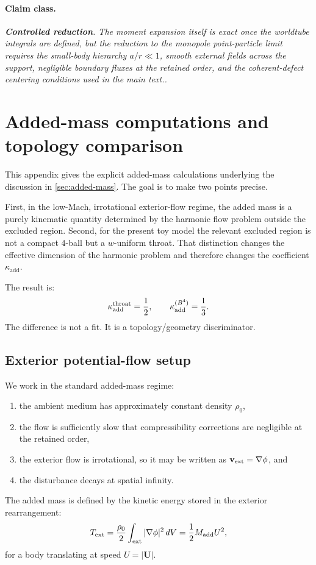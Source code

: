 \documentclass[11pt]{article}
\newcommand{\kadd}{\kappa_{\mathrm{add}}}
\newcommand{\Controlled}{\textbf{Controlled reduction}}
\newcommand{\claimclass}[1]{\paragraph{Claim class.}\emph{#1.}}
\begin{document}
\claimclass{\Controlled. The moment expansion itself is exact once the worldtube integrals
are defined, but the reduction to the monopole point-particle limit requires the small-body
hierarchy \(a/r\ll 1\), smooth external fields across the support, negligible boundary
fluxes at the retained order, and the coherent-defect centering conditions used in the
main text.}

\section{Added-mass computations and topology comparison}
\label{app:added-mass}

This appendix gives the explicit added-mass calculations underlying the discussion in
\cref{sec:added-mass}. The goal is to make two points precise.

First, in the low-Mach, irrotational exterior-flow regime, the added mass is a purely
kinematic quantity determined by the harmonic flow problem outside the excluded region.
Second, for the present toy model the relevant excluded region is not a compact \(4\)-ball
but a \(w\)-uniform throat. That distinction changes the effective dimension of the
harmonic problem and therefore changes the coefficient \(\kadd\).

The result is:
\begin{equation}
\kadd^{\rm throat}=\frac12,
\qquad
\kadd^{(B^4)}=\frac13.
\label{eq:app-kadd-results}
\end{equation}
The difference is not a fit. It is a topology/geometry discriminator.

\subsection{Exterior potential-flow setup}
\label{app:added-mass-setup}

We work in the standard added-mass regime:
\begin{enumerate}[leftmargin=1.5em]
  \item the ambient medium has approximately constant density \(\rho_0\),
  \item the flow is sufficiently slow that compressibility corrections are negligible at
  the retained order,
  \item the exterior flow is irrotational, so it may be written as
  \(\mathbf v_{\rm ext}=\nabla \phi\), and
  \item the disturbance decays at spatial infinity.
\end{enumerate}
The added mass is defined by the kinetic energy stored in the exterior rearrangement:
\begin{equation}
T_{\rm ext}
=
\frac{\rho_0}{2}\int_{\rm ext} |\nabla \phi|^2\,dV
=
\frac12 M_{\rm add} U^2,
\label{eq:app-added-mass-def}
\end{equation}
for a body translating at speed \(U=|\mathbf U|\).
\end{document}
